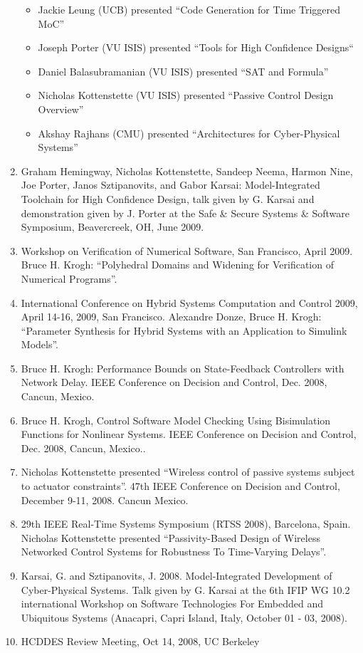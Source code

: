 \begin{enumerate}
\begin{itemize}
\item Jackie Leung (UCB) presented ``Code Generation for Time Triggered MoC''
\item Joseph Porter (VU ISIS) presented ``Tools for High Confidence Designs``
\item Daniel Balasubramanian (VU ISIS) presented ``SAT and Formula''
\item Nicholas Kottenstette (VU ISIS) presented ``Passive Control Design Overview''
\item Akshay Rajhans (CMU) presented ``Architectures for Cyber-Physical Systems''
\end{itemize}
\item Graham Hemingway, Nicholas Kottenstette, Sandeep Neema, Harmon Nine, Joe Porter, Janos Sztipanovits, and Gabor Karsai: Model-Integrated Toolchain for High Confidence Design, talk given by G. Karsai and demonstration given by J. Porter at the Safe \& Secure Systems \& Software Symposium, Beavercreek, OH, June 2009.
\item Workshop on Verification of Numerical Software, San Francisco, April 2009. Bruce H. Krogh: ``Polyhedral Domains and Widening for Verification of Numerical Programs''.
\item International Conference on Hybrid Systems Computation and Control 2009, April 14-16, 2009, San Francisco.  Alexandre Donze, Bruce H. Krogh: ``Parameter Synthesis for Hybrid Systems with an Application to Simulink Models''.
\item Bruce H. Krogh: Performance Bounds on State-Feedback Controllers with Network Delay. IEEE Conference on Decision and Control, Dec. 2008, Cancun, Mexico. 
\item Bruce H. Krogh, Control Software Model Checking Using Bisimulation Functions for Nonlinear Systems. IEEE Conference on Decision and Control, Dec. 2008, Cancun, Mexico.. 
\item Nicholas Kottenstette presented ``Wireless control of passive systems subject to actuator constraints''. 47th IEEE Conference on Decision and Control, December 9-11, 2008. Cancun Mexico.  
\item 29th IEEE Real-Time Systems Symposium (RTSS 2008), Barcelona,  Spain. Nicholas Kottenstette presented ``Passivity-Based Design of Wireless Networked Control Systems for Robustness To Time-Varying Delays''.
\item Karsai, G. and Sztipanovits, J. 2008. Model-Integrated Development of Cyber-Physical Systems. Talk given by G. Karsai at the 6th IFIP WG 10.2 international Workshop on Software Technologies For Embedded and Ubiquitous Systems (Anacapri, Capri Island, Italy, October 01 - 03, 2008).
\item HCDDES Review Meeting, Oct 14, 2008, UC Berkeley 


\end{enumerate}
